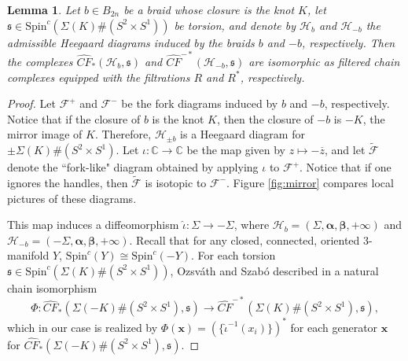 \documentclass[11pt]{article}
\theoremstyle{plain} \newtheorem{thm}{Theorem}[subsection]
\theoremstyle{plain} \newtheorem{cor}[thm]{Corollary}
\theoremstyle{plain} \newtheorem{prop}[thm]{Proposition}
\theoremstyle{plain} \newtheorem{conj}[thm]{Conjecture}
\theoremstyle{plain} \newtheorem{lem}[thm]{Lemma}
\theoremstyle{definition} \newtheorem{df}[thm]{Definition}
\theoremstyle{remark} \newtheorem{rmk}[thm]{Remark}
\theoremstyle{remark} \newtheorem{obs}[thm]{Observation}
\newcommand{\B}[1]{B_{#1} }
\newcommand{\DBCs}[1]{\Sigma(#1)\#(S^{2}\times S^{1})}
\newcommand{\Fcal}{\mathcal{F}}
\newcommand{\h}{\mathcal{H}}
\newcommand{\tld}[1]{\widetilde{#1}}
\newcommand{\OS}{Ozsv\'ath and Szab\'o }
\newcommand{\ba}{\boldsymbol{\alpha}}
\newcommand{\bb}{\boldsymbol{\beta}}
\newcommand{\bx}{\mathbf{x}}
\begin{document}
\begin{lem}\label{lem:Rdual3}
Let $b\in \B{2n}$ be a braid whose closure is the knot $K$, let $\mathfrak{s} \in \text{Spin}^{c}(\DBCs{K})$ be torsion,  and denote by $\h_{b}$ and $\h_{-b}$ the admissible Heegaard diagrams induced by the braids $b$ and $-b$, respectively.  Then the complexes $\widehat{CF}_{*}\left( \h_{b}, \mathfrak{s} \right)$ and $\widehat{CF}^{-*}\left( \h_{-b}, \mathfrak{s}\right)$ are isomorphic as filtered chain complexes equipped with the filtrations $R$ and $R^{*}$, respectively.
\end{lem}

\begin{proof}
Let $\Fcal^{+}$ and $\Fcal^{-}$ be the fork diagrams induced by $b$ and $-b$, respectively.  Notice that if the closure of $b$ is the knot $K$, then the closure of $-b$ is $-K$, the mirror image of $K$.  Therefore, $\h_{\pm b}$ is a Heegaard diagram for $\pm \DBCs{K}$.  Let $\iota:\mathbb{C}\rightarrow\mathbb{C}$ be the map given by $z \mapsto -\overline{z}$, and let $\tld{\Fcal}$ denote the ``fork-like" diagram obtained by applying $\iota$ to $\Fcal^{+}$.  Notice that if one ignores the handles, then $\tld{\Fcal}$ is isotopic to $\Fcal^{-}$.  Figure \ref{fig:mirror} compares local pictures of these diagrams.

This map induces a diffeomorphism $\widehat{\iota}: \Sigma \rightarrow -\Sigma$, where $\h_{b} = \left( \Sigma, \ba, \bb, +\infty \right)$ and $\h_{-b} = \left( -\Sigma, \ba, \bb, +\infty \right)$.  Recall that for any closed, connected, oriented 3-manifold $Y$, $\text{Spin}^{c}(Y) \cong \text{Spin}^{c}(-Y)$.  For each torsion $\mathfrak{s} \in \text{Spin}^{c}(\DBCs{K})$, \OS described in \cite{os:disk2} a natural chain isomorphism
\begin{equation*}
\Phi:\widehat{CF}_{*}(\DBCs{-K},\mathfrak{s}) \rightarrow  \widehat{CF}^{-*}(\DBCs{K},\mathfrak{s}),
\end{equation*}
which in our case is realized by $\Phi(\bx) = \left(\{ \widehat{\iota}^{-1}(x_{i}) \} \right)^{*}$  for each generator $\bx$ for $\widehat{CF}_{*}(\DBCs{-K},\mathfrak{s})$.


\end{proof}
\end{document}
